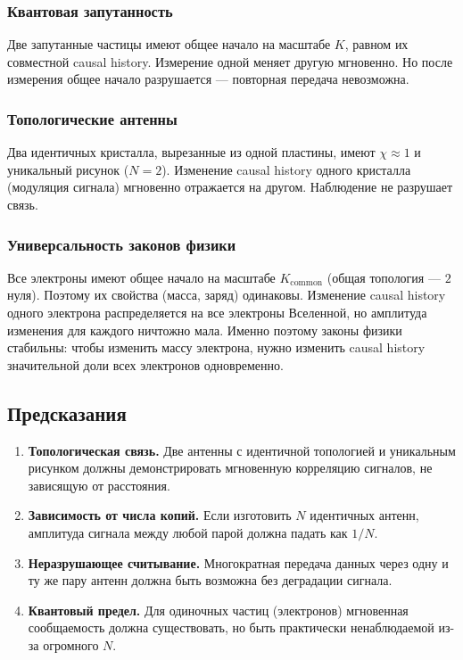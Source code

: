 \documentclass[12pt,a4paper]{article}
\begin{document}
\subsubsection{Квантовая запутанность}
Две запутанные частицы имеют общее начало на масштабе $K$, равном их совместной causal history. Измерение одной меняет другую мгновенно. Но после измерения общее начало разрушается --- повторная передача невозможна.

\subsubsection{Топологические антенны}
Два идентичных кристалла, вырезанные из одной пластины, имеют $\chi \approx 1$ и уникальный рисунок ($N = 2$). Изменение causal history одного кристалла (модуляция сигнала) мгновенно отражается на другом. Наблюдение не разрушает связь.

\subsubsection{Универсальность законов физики}
Все электроны имеют общее начало на масштабе $K_{\text{common}}$ (общая топология --- $2$ нуля). Поэтому их свойства (масса, заряд) одинаковы. Изменение causal history одного электрона распределяется на все электроны Вселенной, но амплитуда изменения для каждого ничтожно мала. Именно поэтому законы физики стабильны: чтобы изменить массу электрона, нужно изменить causal history значительной доли всех электронов одновременно.

\subsection{Предсказания}
\begin{enumerate}[label=\arabic*.]
    \item \textbf{Топологическая связь.} Две антенны с идентичной топологией и уникальным рисунком должны демонстрировать мгновенную корреляцию сигналов, не зависящую от расстояния.
    \item \textbf{Зависимость от числа копий.} Если изготовить $N$ идентичных антенн, амплитуда сигнала между любой парой должна падать как $1/N$.
    \item \textbf{Неразрушающее считывание.} Многократная передача данных через одну и ту же пару антенн должна быть возможна без деградации сигнала.
    \item \textbf{Квантовый предел.} Для одиночных частиц (электронов) мгновенная сообщаемость должна существовать, но быть практически ненаблюдаемой из-за огромного $N$.
\end{enumerate}
\end{document}
